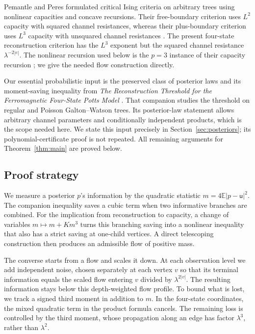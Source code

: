 \documentclass[11pt]{article}
\numberwithin{equation}{section}
\newcommand{\E}{\mathbb E}
\newcommand{\unif}{\mathsf u}
\begin{document}
Pemantle and Peres \cite{PP10} formulated critical Ising criteria
on arbitrary trees using nonlinear capacities and concave
recursions. Their free-boundary criterion uses $L^2$ capacity
with squared channel resistances, whereas their plus-boundary
criterion uses $L^3$ capacity with unsquared channel resistances
\cite[Theorems~2.1--2.2]{PP10}. The present four-state
reconstruction criterion has the $L^3$ exponent but the squared
channel resistance $\lambda^{-2|e|}$. The nonlinear recursion
used below is the $p=3$ instance of their capacity recursion
\cite[Lemma~3.1 and Corollary~3.4]{PP10}; we give the needed
flow construction directly.

Our essential probabilistic input is the preserved class of
posterior laws and its moment-saving inequality from
\emph{The Reconstruction Threshold for the Ferromagnetic Four-State
Potts Model} \cite[Proposition~3.2]{OpenAI26Potts}. That companion
studies the threshold on regular and Poisson Galton--Watson trees.
Its posterior-law statement allows arbitrary channel parameters
and conditionally independent products, which is the scope
needed here. We state this input precisely in
Section~\ref{sec:posteriors}; its polynomial-certificate proof is
not repeated. All remaining arguments for Theorem~\ref{thm:main}
are proved below.

\subsection*{Proof strategy}
We measure a posterior $p$'s information by the quadratic statistic
$m=4\E|p-\unif|^2$. The companion inequality saves a cubic term when two
informative branches are combined. For the implication from
reconstruction to capacity, a change of variables $m\mapsto m+Km^3$
turns this branching saving into a nonlinear inequality that also
has a strict saving at one-child vertices. A direct telescoping
construction then produces an admissible flow of positive mass.

The converse starts from a flow and scales it down. At each
observation level we add independent noise, chosen separately at
each vertex $v$ so that its terminal information equals the
scaled flow entering $v$ divided by $\lambda^{2|v|}$.
The resulting information stays below this depth-weighted flow profile.
To bound what is lost, we track a signed third moment in addition
to $m$. In the four-state coordinates, the mixed quadratic term
in the product formula cancels. The remaining loss is controlled
by the third moment, whose propagation along an edge has factor
$\lambda^3$, rather than $\lambda^2$.
\end{document}
